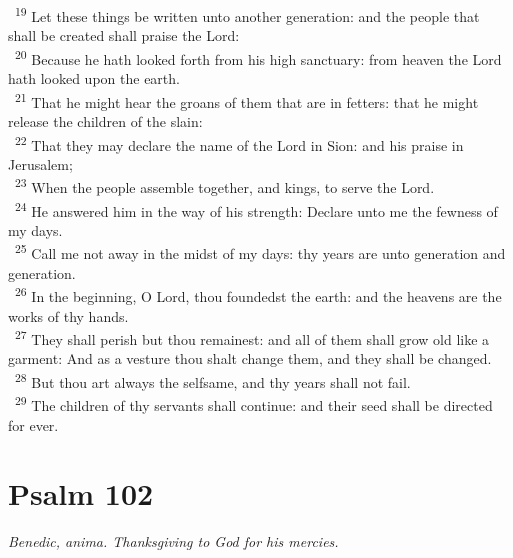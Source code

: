 \documentclass[a5paper,12pt]{article}
\begin{document}
\begin{multicols*}{2}
~\textsuperscript{19} Let these things be written unto another generation: and the people that shall be created shall praise the Lord:\\
~\textsuperscript{20} Because he hath looked forth from his high sanctuary: from heaven the Lord hath looked upon the earth.\\
~\textsuperscript{21} That he might hear the groans of them that are in fetters: that he might release the children of the slain:\\
~\textsuperscript{22} That they may declare the name of the Lord in Sion: and his praise in Jerusalem;\\
~\textsuperscript{23} When the people assemble together, and kings, to serve the Lord.\\
~\textsuperscript{24} He answered him in the way of his strength: Declare unto me the fewness of my days.\\
~\textsuperscript{25} Call me not away in the midst of my days: thy years are unto generation and generation.\\
~\textsuperscript{26} In the beginning, O Lord, thou foundedst the earth: and the heavens are the works of thy hands.\\
~\textsuperscript{27} They shall perish but thou remainest: and all of them shall grow old like a garment: And as a vesture thou shalt change them, and they shall be changed.\\
~\textsuperscript{28} But thou art always the selfsame, and thy years shall not fail.\\
~\textsuperscript{29} The children of thy servants shall continue: and their seed shall be directed for ever.\\

\section{Psalm 102}
\label{sec:orgb89a79e}
\emph{Benedic, anima. Thanksgiving to God for his mercies.}\\


\end{multicols*}
\end{document}
